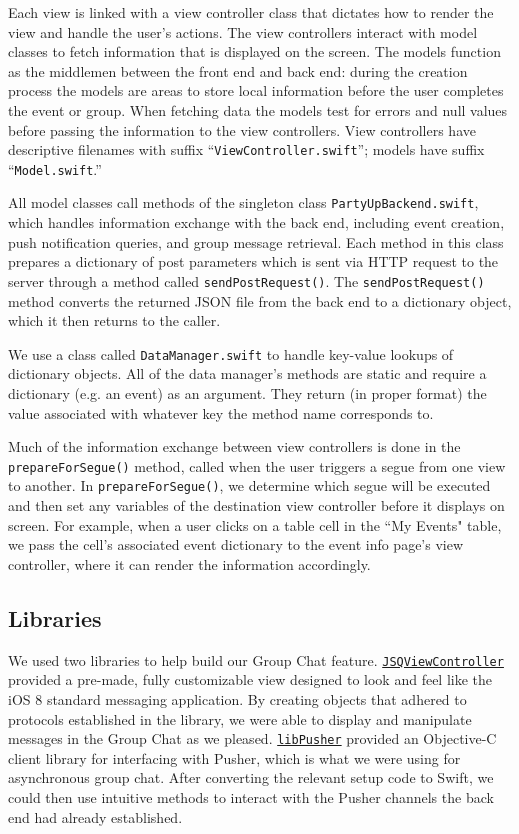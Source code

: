\documentclass[12pt]{article}
\begin{document}
Each view is linked with a view controller class
that dictates how to render the view and handle the user's actions. 
The view controllers interact with model classes to fetch information 
that is displayed on the screen. 
The models function as the middlemen between the front end and back end: 
during the creation process the models are areas to store local information 
before the user completes the event or group. When fetching data the models 
test for errors and null values before passing the information to the view controllers.
View controllers have descriptive filenames with suffix ``\texttt{ViewController.swift}''; 
models have suffix ``\texttt{Model.swift}.''

All model classes call methods of the singleton class \texttt{PartyUpBackend.swift},
which handles information exchange with the back end, including event creation,
push notification queries, and group message retrieval.
Each method in this class prepares a dictionary of post parameters which is
sent via HTTP request to the server through a method called \texttt{sendPostRequest()}.
The \texttt{sendPostRequest()} method converts the returned JSON file from the back end to a dictionary object,
which it then returns to the caller.

We use a class called \texttt{DataManager.swift} to handle key-value lookups of dictionary objects.
All of the data manager's methods are static and require a dictionary (e.g. an event) as an argument.
They return (in proper format) the value associated with whatever key the method name corresponds to. 

Much of the information exchange between view controllers is done in the \texttt{prepareForSegue()} method,
called when the user triggers a segue from one view to another. In \texttt{prepareForSegue()},
we determine which segue will be executed and then set any variables of the destination view
controller before it displays on screen.
For example, when a user clicks on a table cell in the ``My Events" table,
we pass the cell's associated event dictionary to the event info page's view controller,
where it can render the information accordingly. 

\subsection{Libraries}
We used two libraries to help build our Group Chat feature.
\href{https://github.com/jessesquires/JSQMessagesViewController}{\texttt{JSQViewController}} 
provided a pre-made, fully customizable view designed to look and feel like the iOS 8 standard
messaging application.
By creating objects that adhered to protocols established in the library, we were able to display
and manipulate messages in the Group Chat as we pleased.
\href{https://github.com/lukeredpath/libPusher}{\texttt{libPusher}} provided an Objective-C
client library for interfacing with Pusher, which is what we were using for asynchronous group
chat. After converting the relevant setup code to Swift, we could then use intuitive methods to
interact with the Pusher channels the back end had already established.
\end{document}
